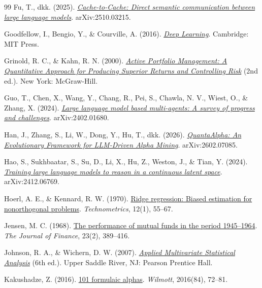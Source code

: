 \begin{thebibliography}{99}
Fu, T., dkk. (2025).
\href{https://arxiv.org/abs/2510.03215}{\emph{Cache-to-Cache: Direct semantic
communication between large language models}}. arXiv:2510.03215.

Goodfellow, I., Bengio, Y., \& Courville, A. (2016).
\href{https://www.deeplearningbook.org}{\emph{Deep Learning}}.
Cambridge: MIT Press.

Grinold, R. C., \& Kahn, R. N. (2000).
\href{https://archive.org/details/activeportfoliom0000grin}{\emph{Active
Portfolio Management: A Quantitative Approach for Producing Superior Returns
and Controlling Risk}} (2nd ed.). New York: McGraw-Hill.

Guo, T., Chen, X., Wang, Y., Chang, R., Pei, S., Chawla, N. V., Wiest, O., \&
Zhang, X. (2024).
\href{https://arxiv.org/abs/2402.01680}{\emph{Large language model based
multi-agents: A survey of progress and challenges}}. arXiv:2402.01680.

Han, J., Zhang, S., Li, W., Dong, Y., Hu, T., dkk. (2026).
\href{https://arxiv.org/abs/2602.07085}{\emph{QuantaAlpha: An Evolutionary
Framework for LLM-Driven Alpha Mining}}. arXiv:2602.07085.

Hao, S., Sukhbaatar, S., Su, D., Li, X., Hu, Z., Weston, J., \& Tian, Y. (2024).
\href{https://arxiv.org/abs/2412.06769}{\emph{Training large language models to
reason in a continuous latent space}}. arXiv:2412.06769.

Hoerl, A. E., \& Kennard, R. W. (1970).
\href{https://doi.org/10.1080/00401706.1970.10488634}{Ridge regression: Biased
estimation for nonorthogonal problems}. \emph{Technometrics}, 12(1), 55--67.

Jensen, M. C. (1968).
\href{https://doi.org/10.1111/j.1540-6261.1968.tb00815.x}{The performance of
mutual funds in the period 1945--1964}. \emph{The Journal of Finance}, 23(2),
389--416.

Johnson, R. A., \& Wichern, D. W. (2007).
\href{https://archive.org/details/appliedmultivari0000john}{\emph{Applied
Multivariate Statistical Analysis}} (6th ed.). Upper Saddle River, NJ: Pearson
Prentice Hall.

Kakushadze, Z. (2016).
\href{https://arxiv.org/abs/1601.00991}{101 formulaic alphas}.
\emph{Wilmott}, 2016(84), 72--81.


\end{thebibliography}
